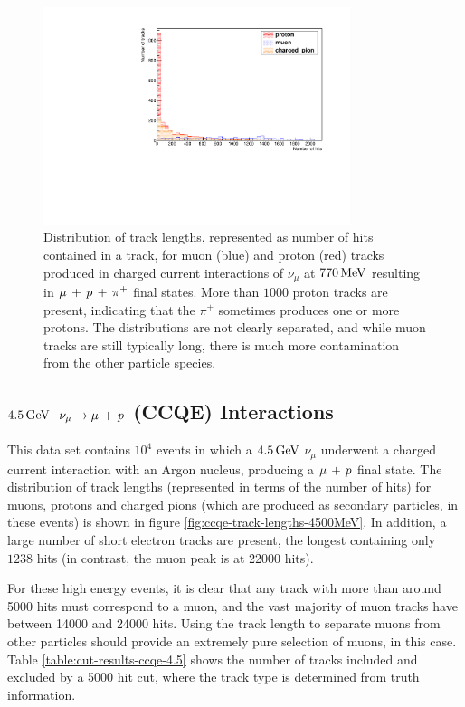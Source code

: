 \begin{figure}
\centering
\includegraphics[angle=-90,width=0.8\textwidth]{chapters/particleid_images/ccpi-770-track-lengths}
\caption[Track length distribution for $\mu$, $p$ and $\pi^+$ from $770\MeV$ neutrinos (\acs{CCPi})]{\label{fig:ccpi-track-lengths-770MeV}Distribution of track lengths, represented as number of hits contained in a track, for muon (blue) and proton (red) tracks produced in charged current interactions of $\nu_\mu$ at $770\MeV$ resulting in $\mu\,+\,p\,+\,\pi^{+}$ final states. More than $1000$ proton tracks are present, indicating that the $\pi^+$ sometimes produces one or more protons. The distributions are not clearly separated, and while muon tracks are still typically long, there is much more contamination from the other particle species.}
\end{figure}

\clearpage
\subsection{$4.5\,\mathrm{GeV}$ \texorpdfstring{$\nu_\mu \rightarrow \mu\,+\,p$}{ν\_μ → μ + p} (CCQE) Interactions}
This data set contains $10^4$ events in which a $4.5\,\mathrm{GeV}$ $\nu_\mu$ underwent a charged current interaction with an Argon nucleus, producing a $\mu\,+\,p$ final state. The distribution of track lengths (represented in terms of the number of hits) for muons, protons and charged pions (which are produced as secondary particles, in these events) is shown in figure \ref{fig:ccqe-track-lengths-4500MeV}. In addition, a large number of short electron tracks are present, the longest containing only $1238$ hits (in contrast, the muon peak is at 22000 hits).

For these high energy events, it is clear that any track with more than around 5000 hits must correspond to a muon, and the vast majority of muon tracks have between 14000 and 24000 hits. Using the track length to separate muons from other particles should provide an extremely pure selection of muons, in this case. Table \ref{table:cut-results-ccqe-4.5} shows the number of tracks included and excluded by a 5000 hit cut, where the track type is determined from truth information.


